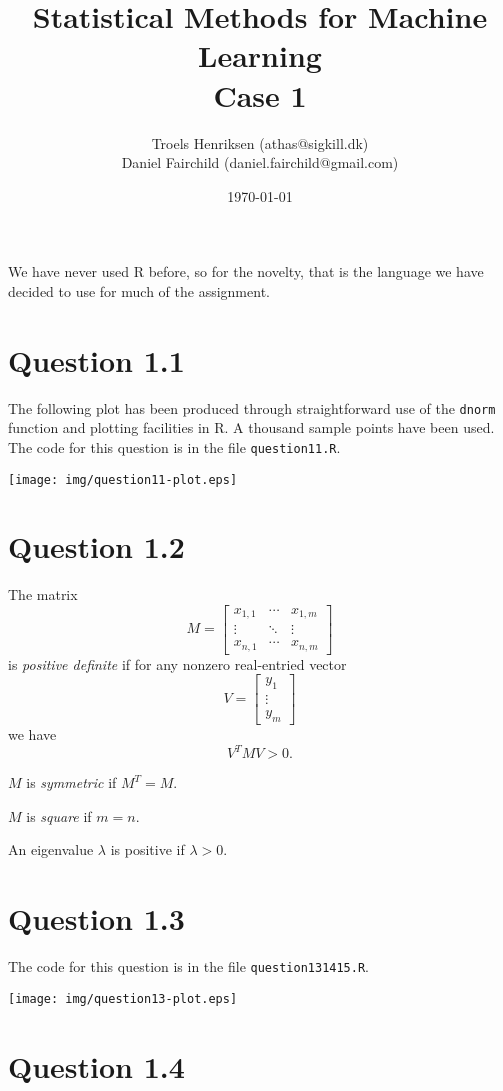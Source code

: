 \documentclass[a4paper, oneside, final]{memoir}
\title{Statistical Methods for Machine Learning\\Case 1}
\author{Troels Henriksen (athas@sigkill.dk) \\ Daniel Fairchild
  (daniel.fairchild@gmail.com)}
\date{\today}
\begin{document}
\maketitle

We have never used R before, so for the novelty, that is the language
we have decided to use for much of the assignment.

\section*{Question 1.1}

The following plot has been produced through straightforward use of
the \texttt{dnorm} function and plotting facilities in R.  A thousand
sample points have been used.  The code for this question is in the
file \texttt{question11.R}.

\texttt{[image: img/question11-plot.eps]}

\section*{Question 1.2}

The matrix
\[
M=\left[\begin{matrix}
  x_{1,1}&\cdots&x_{1,m}\\\vdots&\ddots&\vdots\\x_{n,1}&\cdots&x_{n,m} \end{matrix}\right]
\]
is \textit{positive definite} if for any nonzero real-entried vector
\[
V=\left[\begin{matrix} y_1 \\ \vdots \\ y_m \end{matrix}\right]
\]
we have
\[
V^TMV > 0.
\]

$M$ is \textit{symmetric} if $M^T=M$.

$M$ is \textit{square} if $m=n$.

An eigenvalue $\lambda$ is positive if $\lambda > 0$.

\section*{Question 1.3}

The code for this question is in the file \texttt{question131415.R}.

\texttt{[image: img/question13-plot.eps]}

\section*{Question 1.4}
\end{document}
